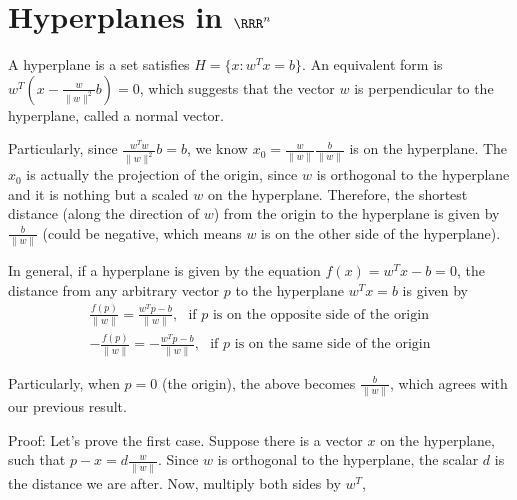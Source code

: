 \section{Hyperplanes in $\RRR^n$}


A hyperplane is a set satisfies $H=\{x:w^Tx=b\}$. An equivalent form is $w^T(x-\frac{w}{\|w\|^2}b) = 0$, which suggests that the vector $w$ is perpendicular to the hyperplane, called a normal vector.

Particularly, since $\frac{w^Tw}{\|w\|^2}b = b$, we know $x_0=\frac{w}{\|w\|}\frac{b}{\|w\|}$ is on the hyperplane. The $x_0$ is actually the projection of the origin, since $w$ is orthogonal to the hyperplane and it is nothing but a scaled $w$ on the hyperplane. Therefore, the shortest distance (along the direction of $w$) from the origin to the hyperplane is given by $\frac{b}{\|w\|}$ (could be negative, which means $w$ is on the other side of the hyperplane).

In general, if a hyperplane is given by the equation $f(x) = w^Tx-b = 0$, the distance from any arbitrary vector $p$ to the hyperplane $w^Tx=b$ is given by
\begin{align}
	\frac{f(p)}{\|w\|} = \frac{w^Tp-b}{\|w\|}, ~~~ \mbox{if $p$ is on the opposite side of the origin}\\
	-\frac{f(p)}{\|w\|} = -\frac{w^Tp-b}{\|w\|}, ~~~ \mbox{if $p$ is on the same side of the origin}
\end{align}	

Particularly, when $p=0$ (the origin), the above becomes $\frac{b}{\|w\|}$, which agrees with our previous result.

Proof: Let's prove the first case. Suppose there is a vector $x$ on the hyperplane, such that $p-x = d\frac{w}{\|w\|}$. Since $w$ is orthogonal to the hyperplane, the scalar $d$ is the distance we are after. Now, multiply both sides by $w^T$,

